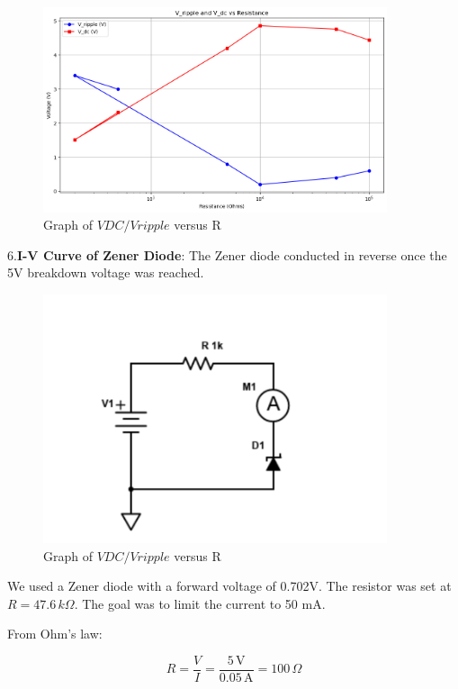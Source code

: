 \documentclass{article}
\begin{document}
\begin{figure}[H]
    \centering
    \includegraphics[width=0.9\textwidth]{./img/Lab4_5.png}
    \caption{Graph of \( VDC/Vripple \) versus R}
    \label{fig:graph13}
\end{figure}


6.\textbf{I-V Curve of Zener Diode}: The Zener diode conducted in reverse once the 5V breakdown voltage was reached.

\begin{figure}[H]
    \centering
    \includegraphics[width=0.9\textwidth]{./img/other/Lab4_6.png}
    \caption{Graph of \( VDC/Vripple \) versus R}
    \label{fig:graph14}
\end{figure}

We used a Zener diode with a forward voltage of 0.702V. The resistor was set at \( R = 47.6 \, k\Omega \). The goal was to limit the current to 50 mA.

From Ohm's law:

\[
R = \frac{V}{I} = \frac{5 \, \text{V}}{0.05 \, \text{A}} = 100 \, \Omega
\]
\end{document}

